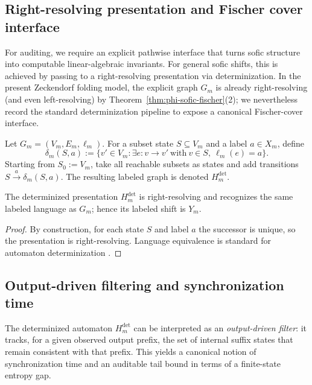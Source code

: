 \subsection{Right-resolving presentation and Fischer cover interface}\label{subsec:right-resolving}
For auditing, we require an explicit pathwise interface that turns sofic structure into computable linear-algebraic invariants.
For general sofic shifts, this is achieved by passing to a right-resolving presentation via determinization.
In the present Zeckendorf folding model, the explicit graph $G_m$ is already right-resolving (and even left-resolving) by Theorem~\ref{thm:phi-sofic-fischer}(2); we nevertheless record the standard determinization pipeline to expose a canonical Fischer-cover interface.

\begin{definition}\label{def:determinization}
Let $G_m=(V_m,E_m,\ell_m)$.
For a subset state $S\subseteq V_m$ and a label $a\in X_m$, define
\[
\delta_m(S,a):=\{v'\in V_m:\exists e:v\to v'\ \text{with}\ v\in S,\ \ell_m(e)=a\}.
\]
Starting from $S_0:=V_m$, take all reachable subsets as states and add transitions
$S\xrightarrow{a}\delta_m(S,a)$.
The resulting labeled graph is denoted $H_m^{\mathrm{det}}$.
\end{definition}

\begin{proposition}\label{prop:right-resolving}
The determinized presentation $H_m^{\mathrm{det}}$ is right-resolving and recognizes the same labeled language as $G_m$; hence its labeled shift is $Y_m$.
\end{proposition}

\begin{proof}
By construction, for each state $S$ and label $a$ the successor is unique, so the presentation is right-resolving.
Language equivalence is standard for automaton determinization \cite{LindMarcus1995,Kitchens1998SymbolicDynamics}.
\end{proof}

\subsection{Output-driven filtering and synchronization time}\label{subsec:sofic-sync}
The determinized automaton $H_m^{\mathrm{det}}$ can be interpreted as an \emph{output-driven filter}:
it tracks, for a given observed output prefix, the set of internal suffix states that remain consistent with that prefix.
This yields a canonical notion of synchronization time and an auditable tail bound in terms of a finite-state entropy gap.

